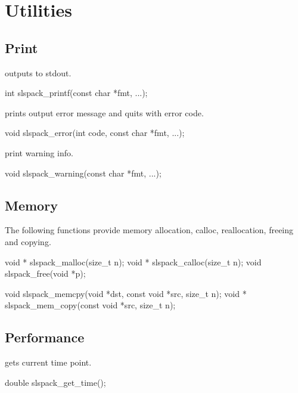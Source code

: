 \chapter{Utilities}

\section{Print}

 outputs to stdout.
\begin{evb}
int slspack_printf(const char *fmt, ...);
\end{evb}

 prints output error message and quits with error code.
\begin{evb}
void slspack_error(int code, const char *fmt, ...);
\end{evb}

 print warning info.
\begin{evb}
void slspack_warning(const char *fmt, ...);
\end{evb}

\section{Memory}
The following functions provide memory allocation, calloc, reallocation, freeing and copying.
\begin{evb}
void * slspack_malloc(size_t n);
void * slspack_calloc(size_t n);
void slspack_free(void *p);

void slspack_memcpy(void *dst, const void *src, size_t n);
void * slspack_mem_copy(const void *src, size_t n);
\end{evb}

\section{Performance}

 gets current time point.
\begin{evb}
double slspack_get_time();
\end{evb}
